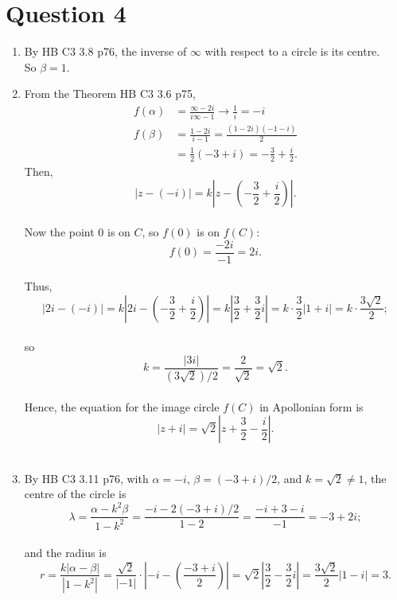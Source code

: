 \newpage
\section{Question 4}
\begin{enumerate}[label=(\alph*)]
    \item %
    By HB C3 3.8 p76, the inverse of $\infty$ with respect to a circle is its centre. \\
    So $\beta = 1$.
    \vvs \\
    \item  %
    From the Theorem HB C3 3.6 p75,
    \begin{align*}
        f(\alpha) &= \frac{ \infty - 2i }{ i\infty - 1 } \to \frac{1}{i} = -i \\
        f(\beta)  &= \frac{ 1-2i }{ i-1 } = \frac{ (1-2i)(-1-i)}{2} \\
        &= \frac{1}{2} ( -3+i ) = -\frac{3}{2} + \frac{i}{2}.
    \end{align*}
    Then,
    \[ |z - (-i)| = k\left| z - \left(-\frac{3}{2} + \frac{i}{2}\right) \right|. \]
    \vs \\
    Now the point 0 is on $C$, so $f(0)$ is on $f(C)$:
    \[ f(0) = \frac{-2i}{-1} = 2i. \]
    \vs \\
    Thus,
    \[ \left| 2i - (-i) \right| = k \left| 2i - \left(-\frac{3}{2} + \frac{i}{2}\right) \right| = k \left| \frac{3}{2} + \frac{3}{2}i\right| = k \cdot \frac{3}{2}\left| 1 + i\right| = k \cdot \frac{3 \sqrt{2}}{2}; \]
    \vs \\
    so
    \[ k = \frac{|3i|}{(3\sqrt{2})/2} = \frac{2}{\sqrt{2}} = \sqrt{2}.\]
    \vs \\
    Hence, the equation for the image circle $f(C)$ in Apollonian form is
    \[ \left|z + i\right| = \sqrt{2}\left| z + \frac{3}{2} - \frac{i}{2}\right|.\]
    \vvs \\
    \item %
    By HB C3 3.11 p76, with $\alpha = -i$, $\beta = (-3 + i)/2$, and $k = \sqrt{2} \neq 1$, the centre of the circle is
    \vs \\
    \[ \lambda = \frac{\alpha - k^2 \beta}{1 - k^2} = \frac{ -i - 2\left( -3 + i \right)/2 }{ 1-2 } = \frac{-i + 3 - i}{-1} = -3 + 2i; \]
    \vs \\
    and the radius is 
    \[ r = \frac{ k \left| \alpha - \beta \right| }{\left| 1 - k^2 \right|} = \frac{\sqrt{2}}{|-1|} \cdot \left|  - i -\left( \frac{-3 + i}{2}\right)\right| = \sqrt{2} \left| \frac{3}{2} - \frac{3}{2}i\right| = \frac{3\sqrt{2}}{2} \left| 1 - i \right| = 3.\]
\end{enumerate}
